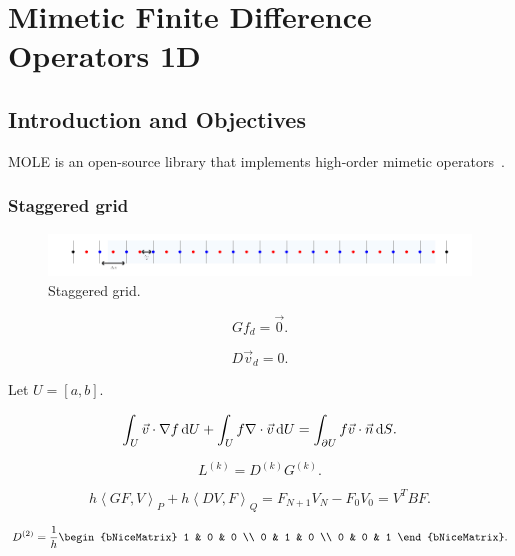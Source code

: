 \part{Mimetic Finite Difference Operators 1D}

\chapter{Introduction and Objectives}

MOLE is an open-source library that implements high-order mimetic
operators~\cite{Corbino2024}.

\section{Staggered grid}

\begin{figure}[ht!]
	\centering
	\includegraphics[width=0.8\paperwidth]{staggered}
	\caption{Staggered grid.}
\end{figure}

\begin{equation*}
	Gf_{d}=\vec{0}.
\end{equation*}

\begin{equation*}
	D\vec{v}_{d}=0.
\end{equation*}

Let $U=\left[a,b\right]$.

\begin{equation*}
	\int_{U}
	\vec{v}\cdot\nabla f\dl U+
	\int_{U}
	f\nabla\cdot\vec{v}\dl U=
	\int_{\partial U}
	f\vec{v}\cdot\vec{n}\dl S.
\end{equation*}

\begin{equation*}
	L^{\left(k\right)}=
	D^{\left(k\right)}
	G^{\left(k\right)}.
\end{equation*}

\begin{equation*}
	h
	{\left\langle GF,V\right\rangle}_{P}+
	h
		{\left\langle DV,F\right\rangle}_{Q}=
	F_{N+1}V_{N}-F_{0}V_{0}=
	V^{T}BF.
\end{equation*}

\begin{equation*}
	D^{\left(2\right)}=
	\frac{1}{h}
	\begin{bNiceMatrix}
		1 & 0 & 0 \\
		0 & 1 & 0 \\
		0 & 0 & 1
	\end{bNiceMatrix}.
\end{equation*}

